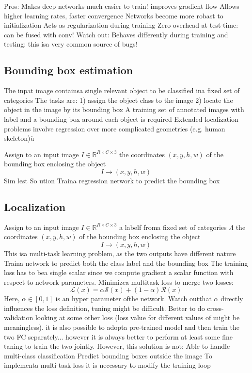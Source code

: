 Pros:
Makes deep networks much easier to train!
improves gradient flow
Allows higher learning rates, faster convergence
Networks become more robast to initialization
Acts as regularization during training
Zero overhead at test-time: can be fused with conv!
Watch out:
Behaves differently during training and testing: this isa very
common source of bugs!

\subsection{Bounding box estimation}
The inpat image containsa single relevant object to be classified ina
fixed set of categories
The tasks are:
1) assign the object class to the image
2) locate the object in the image by its bounding box
A training set of annotated images with label and
a bounding box around each object is required
Extended localization problems involve regression over
more complicated geometries (e.g. human skeleton)ù

Assign to an input image $I\in \mathbb{R}^{R\times C \times 3}$ the coordinates $(x,y, h, w)$ of the bounding box enclosing the object
\[I\rightarrow(x,y, h, w)\]
Sim lest So ution
Traina regression network to predict the bounding box


\subsection{Localization}
Assign to an input image $I\in \mathbb{R}^{R\times C \times 3}$ a labelf froma fixed set of categories $\Lambda$ the coordinates $(x,y, h, w)$ of the bounding box enclosing the object
\[I\rightarrow(x,y, h, w)\]
This isa multi-task learning problem, as the two outputs have
different nature
Traina network to predict both the class label and the bounding box
The training loss has to bea single scalar since we compute gradient
a scalar function with respect to network parameters.
Minimizea multitask loss to merge two losses:
\[\mathcal{L}(x)=\alpha\mathcal{S}(x)+(1-\alpha)\mathcal{R}(x)\]
Here, $\alpha\in[0,1]$ is an hyper parameter ofthe network.
Watch outthat $\alpha$ directly influences the loss definition, tuning might be
difficult. Better to do cross-validation looking at some other loss (loss
value for different values of might be meaningless).
it is also possible to adopta pre-trained model and then train the two
FC separately... however it is always better to perform at least some
fine taning to train the two jointly.
However, this solution is not:
Able to handle multi-class classification
Predict bounding boxes outside the image
To implementa multi-task loss it is necessary to modify the training loop

